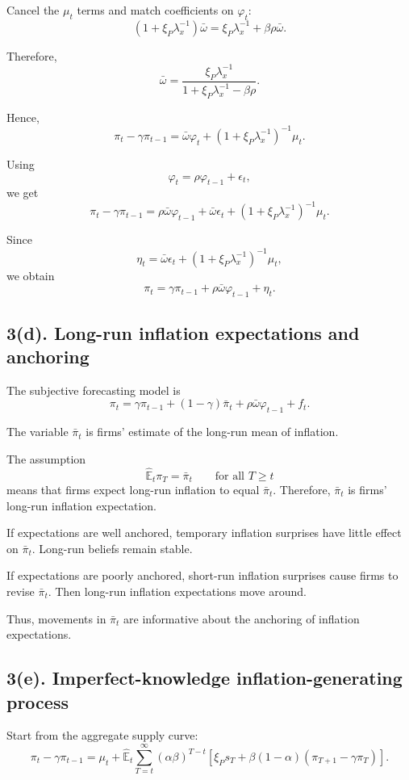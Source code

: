 \documentclass[12pt]{article}
\begin{document}
Cancel the $\mu_t$ terms and match coefficients on $\varphi_t$:
\[
(1+\xi_P\lambda_x^{-1})\bar{\omega}
=
\xi_P\lambda_x^{-1}
+
\beta\rho\bar{\omega}.
\]

Therefore,
\[
\boxed{
\bar{\omega}
=
\frac{\xi_P\lambda_x^{-1}}
{
1+\xi_P\lambda_x^{-1}-\beta\rho
}.
}
\]

Hence,
\[
\pi_t-\gamma\pi_{t-1}
=
\bar{\omega}\varphi_t
+
(1+\xi_P\lambda_x^{-1})^{-1}\mu_t.
\]

Using
\[
\varphi_t=\rho\varphi_{t-1}+\epsilon_t,
\]
we get
\[
\pi_t-\gamma\pi_{t-1}
=
\rho\bar{\omega}\varphi_{t-1}
+
\bar{\omega}\epsilon_t
+
(1+\xi_P\lambda_x^{-1})^{-1}\mu_t.
\]

Since
\[
\eta_t
=
\bar{\omega}\epsilon_t
+
(1+\xi_P\lambda_x^{-1})^{-1}\mu_t,
\]
we obtain
\[
\boxed{
\pi_t
=
\gamma\pi_{t-1}
+
\rho\bar{\omega}\varphi_{t-1}
+
\eta_t.
}
\]

\subsection*{3(d). Long-run inflation expectations and anchoring}

The subjective forecasting model is
\[
\pi_t
=
\gamma\pi_{t-1}
+
(1-\gamma)\bar{\pi}_t
+
\rho\bar{\omega}\varphi_{t-1}
+
f_t.
\]

The variable $\bar{\pi}_t$ is firms' estimate of the long-run mean of inflation.

The assumption
\[
\hat{\mathbb{E}}_t\pi_T=\bar{\pi}_t
\qquad
\text{for all } T\geq t
\]
means that firms expect long-run inflation to equal $\bar{\pi}_t$. Therefore, $\bar{\pi}_t$ is firms' long-run inflation expectation.

If expectations are well anchored, temporary inflation surprises have little effect on $\bar{\pi}_t$. Long-run beliefs remain stable.

If expectations are poorly anchored, short-run inflation surprises cause firms to revise $\bar{\pi}_t$. Then long-run inflation expectations move around.

Thus, movements in $\bar{\pi}_t$ are informative about the anchoring of inflation expectations.

\subsection*{3(e). Imperfect-knowledge inflation-generating process}

Start from the aggregate supply curve:
\[
\pi_t-\gamma\pi_{t-1}
=
\mu_t
+
\hat{\mathbb{E}}_{t}
\sum_{T=t}^{\infty}
(\alpha\beta)^{T-t}
\left[
\xi_P s_T
+
\beta(1-\alpha)(\pi_{T+1}-\gamma\pi_T)
\right].
\]
\end{document}
